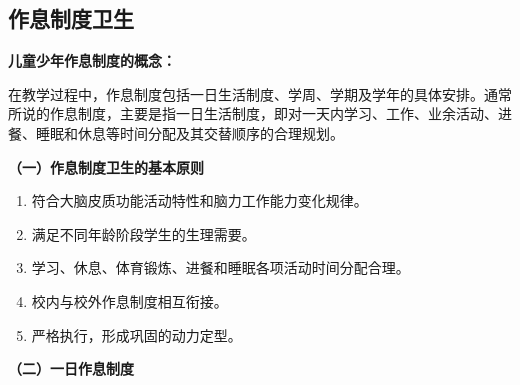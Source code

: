\subsection{作息制度卫生}

\begin{defbox}
\textbf{儿童少年作息制度的概念：}

在教学过程中，作息制度包括一日生活制度、学周、学期及学年的具体安排。通常所说的作息制度，主要是指一日生活制度，即对一天内学习、工作、业余活动、进餐、睡眠和休息等时间分配及其交替顺序的合理规划。
\end{defbox}

\begin{keybox}
\textbf{（一）作息制度卫生的基本原则}

\begin{enumerate}[leftmargin=*]
    \item 符合大脑皮质功能活动特性和脑力工作能力变化规律。
    \item 满足不同年龄阶段学生的生理需要。
    \item 学习、休息、体育锻炼、进餐和睡眠各项活动时间分配合理。
    \item 校内与校外作息制度相互衔接。
    \item 严格执行，形成巩固的动力定型。
\end{enumerate}

\textbf{（二）一日作息制度}


\end{keybox}
